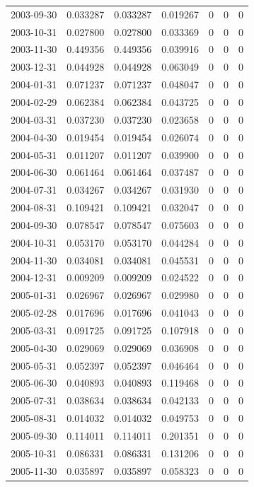 \documentclass[conference,onecolumn]{IEEEtran}
\begin{document}
\begin{longtable}{|c|c|c|c|c|c|c|}
2003-09-30 & 0.033287 & 0.033287 & 0.019267 & 0 & 0 & 0 \\
2003-10-31 & 0.027800 & 0.027800 & 0.033369 & 0 & 0 & 0 \\
2003-11-30 & 0.449356 & 0.449356 & 0.039916 & 0 & 0 & 0 \\
2003-12-31 & 0.044928 & 0.044928 & 0.063049 & 0 & 0 & 0 \\
2004-01-31 & 0.071237 & 0.071237 & 0.048047 & 0 & 0 & 0 \\
2004-02-29 & 0.062384 & 0.062384 & 0.043725 & 0 & 0 & 0 \\
2004-03-31 & 0.037230 & 0.037230 & 0.023658 & 0 & 0 & 0 \\
2004-04-30 & 0.019454 & 0.019454 & 0.026074 & 0 & 0 & 0 \\
2004-05-31 & 0.011207 & 0.011207 & 0.039900 & 0 & 0 & 0 \\
2004-06-30 & 0.061464 & 0.061464 & 0.037487 & 0 & 0 & 0 \\
2004-07-31 & 0.034267 & 0.034267 & 0.031930 & 0 & 0 & 0 \\
2004-08-31 & 0.109421 & 0.109421 & 0.032047 & 0 & 0 & 0 \\
2004-09-30 & 0.078547 & 0.078547 & 0.075603 & 0 & 0 & 0 \\
2004-10-31 & 0.053170 & 0.053170 & 0.044284 & 0 & 0 & 0 \\
2004-11-30 & 0.034081 & 0.034081 & 0.045531 & 0 & 0 & 0 \\
2004-12-31 & 0.009209 & 0.009209 & 0.024522 & 0 & 0 & 0 \\
2005-01-31 & 0.026967 & 0.026967 & 0.029980 & 0 & 0 & 0 \\
2005-02-28 & 0.017696 & 0.017696 & 0.041043 & 0 & 0 & 0 \\
2005-03-31 & 0.091725 & 0.091725 & 0.107918 & 0 & 0 & 0 \\
2005-04-30 & 0.029069 & 0.029069 & 0.036908 & 0 & 0 & 0 \\
2005-05-31 & 0.052397 & 0.052397 & 0.046464 & 0 & 0 & 0 \\
2005-06-30 & 0.040893 & 0.040893 & 0.119468 & 0 & 0 & 0 \\
2005-07-31 & 0.038634 & 0.038634 & 0.042133 & 0 & 0 & 0 \\
2005-08-31 & 0.014032 & 0.014032 & 0.049753 & 0 & 0 & 0 \\
2005-09-30 & 0.114011 & 0.114011 & 0.201351 & 0 & 0 & 0 \\
2005-10-31 & 0.086331 & 0.086331 & 0.131206 & 0 & 0 & 0 \\
2005-11-30 & 0.035897 & 0.035897 & 0.058323 & 0 & 0 & 0 \\

\end{longtable}
\end{document}
